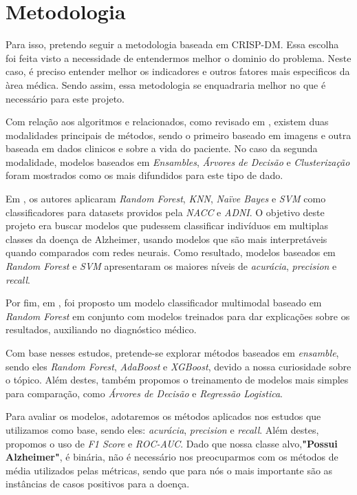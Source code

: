 \documentclass{paper}
\begin{document}
\section{Metodologia}

Para isso, pretendo seguir a metodologia baseada em CRISP-DM. Essa escolha foi feita visto a necessidade de entendermos melhor o dominio do problema. Neste caso, é preciso entender melhor os indicadores e outros fatores mais especificos da àrea médica. Sendo assim, essa metodologia se enquadraria melhor no que é necessário para este projeto.

Com relação aos algoritmos e relacionados, como revisado em \cite{Review}, existem duas modalidades principais de métodos, sendo o primeiro baseado em imagens e outra baseada em dados clinicos e sobre a vida do paciente. No caso da segunda modalidade, modelos baseados em \textit{Ensambles}, \textit{Árvores de Decisão} e \textit{Clusterização} foram mostrados como os mais difundidos para este tipo de dado.

Em \cite{4Methods}, os autores aplicaram \textit{Random Forest}, \textit{KNN}, \textit{Naïve Bayes} e \textit{SVM} como classificadores para datasets providos pela \textit{NACC} e \textit{ADNI}. O objetivo deste projeto era buscar modelos que pudessem classificar indivíduos em multiplas classes da doença de Alzheimer, usando modelos que são mais interpretáveis quando comparados com redes neurais. Como resultado, modelos baseados em \textit{Random Forest} e \textit{SVM} apresentaram os maiores níveis de \textit{acurácia}, \textit{precision} e \textit{recall}.

Por fim, em \cite{Multimodal}, foi proposto um modelo classificador multimodal baseado em \textit{Random Forest} em conjunto com modelos treinados para dar explicações sobre os resultados, auxiliando no diagnóstico médico. 

Com base nesses estudos, pretende-se explorar métodos baseados em \textit{ensamble}, sendo eles \textit{Random Forest}, \textit{AdaBoost} e \textit{XGBoost}, devido a nossa curiosidade sobre o tópico. Além destes, também propomos o treinamento de modelos mais simples para comparação, como \textit{Árvores de Decisão} e \textit{Regressão Logistica}.

Para avaliar os modelos, adotaremos os métodos aplicados nos estudos que utilizamos como base, sendo eles: \textit{acurácia}, \textit{precision} e \textit{recall}. Além destes, propomos o uso de \textit{F1 Score} e \textit{ROC-AUC}. Dado que nossa classe alvo,\textbf{"Possui Alzheimer"}, é binária, não é necessário nos preocuparmos com os métodos de média utilizados pelas métricas, sendo que para nós o mais importante são as instâncias de casos positivos para a doença.
\end{document}
